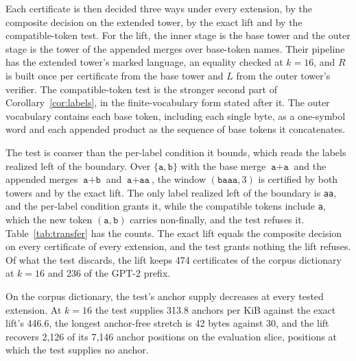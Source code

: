 \documentclass[11pt,a4paper]{article}
\theoremstyle{definition}
\theoremstyle{plain}
\newcommand{\code}[1]{\texttt{#1}}
\begin{document}
Each certificate is then decided three ways under every extension, by the composite decision on the extended tower, by
the exact lift and by the compatible-token test. For the lift, the inner stage is the base tower and the outer stage is
the tower of the appended merges over base-token names. Their pipeline has the extended tower's marked language, an
equality checked at $k = 16$, and $R$ is built once per certificate from the base tower and $L$ from the outer tower's
verifier. The compatible-token test is the stronger second part of Corollary~\ref{cor:labels}, in the finite-vocabulary
form stated after it. The outer vocabulary contains each base token, including each single byte, as a one-symbol word
and each appended product as the sequence of base tokens it concatenates.

The test is coarser than the per-label condition it bounds, which reads the labels realized left of the boundary. Over
$\{\code{a}, \code{b}\}$ with the base merge $\code{a}+\code{a}$ and the appended merges $\code{a}+\code{b}$ and
$\code{a}+\code{aa}$, the window $(\code{baaa}, 3)$ is certified by both towers and by the exact lift. The only label
realized left of the boundary is \code{aa}, and the per-label condition grants it, while the compatible tokens include
\code{a}, which the new token $(\code{a}, \code{b})$ carries non-finally, and the test refuses it.
Table~\ref{tab:transfer} has the counts. The exact lift equals the composite decision on every certificate of every
extension, and the test grants nothing the lift refuses. Of what the test discards, the lift keeps 474 certificates of
the corpus dictionary at $k = 16$ and 236 of the GPT-2 prefix.

On the corpus dictionary, the test's anchor supply decreases at every tested extension. At $k = 16$ the test supplies
313.8 anchors per KiB against the exact lift's 446.6, the longest anchor-free stretch is 42 bytes against 30, and the
lift recovers 2{,}126 of its 7{,}146 anchor positions on the evaluation slice, positions at which the test supplies no
anchor.
\end{document}
